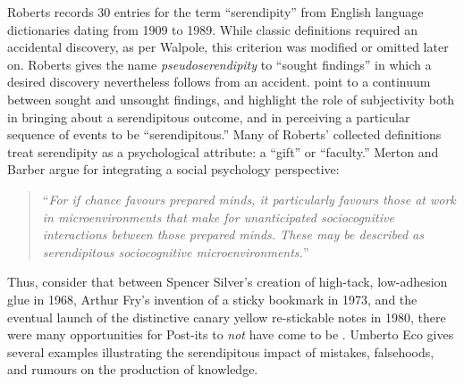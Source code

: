 Roberts \cite[pp.~246--249]{roberts} records 30 entries for the term ``serendipity'' from English language dictionaries dating from 1909 to 1989.
%
While classic definitions required an accidental discovery, as per Walpole, this criterion was modified
or omitted later on.  Roberts gives the name \emph{pseudoserendipity} to
``sought findings'' in which a desired discovery nevertheless
follows from an accident.
\citet{Makri2012a,Makri2012b} point to a continuum between sought and
unsought findings, and highlight the role of subjectivity both in
bringing about a serendipitous outcome, and in perceiving a particular
sequence of events to be ``serendipitous.''
Many of Roberts' collected definitions treat serendipity
as a psychological attribute: a ``gift'' or ``faculty.''
Merton and Barber argue for integrating a social psychology
perspective:
\begin{quote}
``\emph{For if chance favours prepared minds, it particularly favours
    those at work in microenvironments that make for unanticipated
    sociocognitive interactions between those prepared minds. These
    may be described as serendipitous sociocognitive
    microenvironments.}'' \cite[p.~259--260]{merton}
\end{quote}
Thus, consider that between Spencer Silver's creation of high-tack,
low-adhesion glue in 1968, Arthur Fry's invention of a sticky bookmark
in 1973, and the eventual launch of the distinctive canary yellow
re-stickable notes in 1980, there were many opportunities for
Post-its\textsuperscript{\textregistered} to \emph{not} have come to
be \cite{tce-postits}.  Umberto Eco \cite{eco2013serendipities} gives
several examples illustrating the serendipitous impact of mistakes,
falsehoods, and rumours on the production of knowledge.

